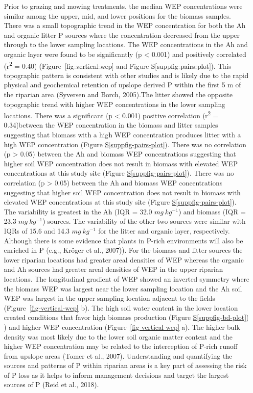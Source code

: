 \documentclass[
]{agujournal2019}
\newcommand*\quartosuppfigref[1]{Figure \hyperref[#1]{S\ref{#1}}}
\begin{document}
Prior to grazing and mowing treatments, the median WEP concentrations
were similar among the upper, mid, and lower positions for the biomass
samples. There was a small topographic trend in the WEP concentration
for both the Ah and organic litter P sources where the concentration
decreased from the upper through to the lower sampling locations. The
WEP concentrations in the Ah and organic layer were found to be
significantly (p \textless{} 0.001) and positively correlated
(r\textsuperscript{2} = 0.40) (Figure~\ref{fig-vertical-wep} and
\quartosuppfigref{suppfig-pairs-plot}). This topographic pattern is
consistent with other studies and is likely due to the rapid physical
and geochemical retention of upslope derived P within the first 5 m of
the riparian area (Syversen and Borch, 2005).The litter showed the
opposite topographic trend with higher WEP concentrations in the lower
sampling locations. There was a significant (p \textless{} 0.001)
positive correlation (r\textsuperscript{2} = 0.34)between the WEP
concentration in the biomass and litter samples suggesting that biomass
with a high WEP concentration produces litter with a high WEP
concentration (\quartosuppfigref{suppfig-pairs-plot}). There was no
correlation (p \textgreater{} 0.05) between the Ah and biomass WEP
concentrations suggesting that higher soil WEP concentration does not
result in biomass with elevated WEP concentrations at this study site
(\quartosuppfigref{suppfig-pairs-plot}). There was no correlation (p
\textgreater{} 0.05) between the Ah and biomass WEP concentrations
suggesting that higher soil WEP concentration does not result in biomass
with elevated WEP concentrations at this study site
(\quartosuppfigref{suppfig-pairs-plot}). The variability is greatest in
the Ah (IQR = 32.0 \(mg~kg^{-1}\)) and biomass (IQR = 23.3
\(mg~kg^{-1}\)) sources. The variability of the other two sources were
similar with IQRs of 15.6 and 14.3 \(mg~kg^{-1}\) for the litter and
organic layer, respectively. Although there is some evidence that plants
in P-rich environments will also be enriched in P (e.g., Kröger et al.,
2007)). For the biomass and litter sources the lower riparian locations
had greater areal densities of WEP whereas the organic and Ah sources
had greater areal densities of WEP in the upper riparian locations. The
longitudinal gradient of WEP showed an inverted symmetry where the
biomass WEP was largest near the lower sampling location and the Ah soil
WEP was largest in the upper sampling location adjacent to the fields
(Figure~\ref{fig-vertical-wep} b). The high soil water content in the
lower location created conditions that favor high biomass production
(\quartosuppfigref{suppfig-bd-plot}) ) and higher WEP concentration
(Figure~\ref{fig-vertical-wep} a). The higher bulk density was most
likely due to the lower soil organic matter content and the higher WEP
concentration may be related to the interception of P-rich runoff from
upslope areas (Tomer et al., 2007). Understanding and quantifying the
sources and patterns of P within riparian areas is a key part of
assessing the risk of P loss as it helps to inform management decisions
and target the largest sources of P (Reid et al., 2018).
\end{document}
